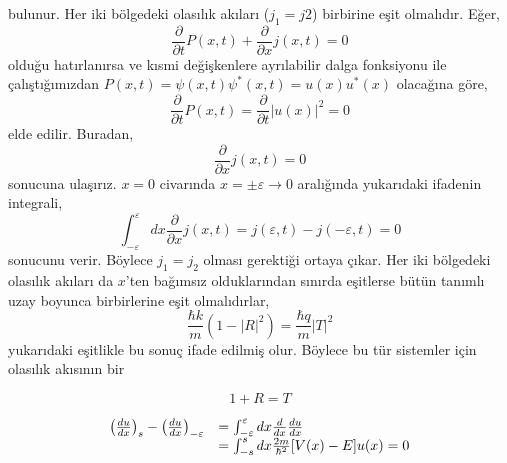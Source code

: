 \documentclass[a4paper,12pt, twoside]{article}
\begin{document}
bulunur. Her iki bölgedeki olasılık akıları ($j_1 = j2$) birbirine eşit olmalıdır. Eğer,
\begin{equation}
\frac { \partial } { \partial t } P ( x , t ) + \frac { \partial } { \partial x } j ( x , t ) = 0
\end{equation}
olduğu hatırlanırsa ve kısmi değişkenlere ayrılabilir dalga fonksiyonu ile çalıştığımızdan $P(x, t) = \psi(x,t) \psi^*(x,t) = u(x) u^*(x)$ olacağına göre,
\begin{equation}\label{key}
\frac { \partial } { \partial t } P ( x , t ) = \frac { \partial } { \partial t } |u ( x)|^2 = 0
\end{equation}
elde edilir. Buradan,
\begin{equation}
\frac { \partial } { \partial x } j ( x , t ) = 0
\end{equation}
sonucuna ulaşırız. $x=0$ civarında $x=\pm\varepsilon \rightarrow 0$ aralığında yukarıdaki ifadenin integrali,
\begin{equation}
\int^{\varepsilon}_{-\varepsilon} dx \frac { \partial } { \partial x } j ( x , t ) = j (\varepsilon  , t ) - j ( -\varepsilon , t ) = 0
\end{equation}
sonucunu verir. Böylece $j_1 = j_2$ olması gerektiği ortaya çıkar. Her iki bölgedeki olasılık akıları da $x$'ten bağımsız olduklarından sınırda eşitlerse bütün tanımlı uzay boyunca birbirlerine eşit olmalıdırlar,
\begin{equation}
\frac { \hbar k } { m } \left( 1 - | R | ^ { 2 } \right) = \frac { \hbar q } { m } | T | ^ { 2 }
\end{equation}
yukarıdaki eşitlikle bu sonuç ifade edilmiş olur. Böylece bu tür sistemler için olasılık akısının bir 


\begin{equation}
1 + R = T
\end{equation}



\begin{equation}
\begin{array} { r l } { \left( \frac { d u } { d x } \right) _ { s } - \left( \frac { d u } { d x } \right) _ { - \varepsilon } } & { = \int _ { - \varepsilon } ^ { \varepsilon } d x \frac { d } { d x } \frac { d u } { d x } } \\ { } & { = \int _ { - s } ^ { s } d x \frac { 2 m } { \hbar ^ { 2 } } [ V ( x ) - E ] u ( x ) = 0 } \end{array}
\end{equation}
\end{document}
